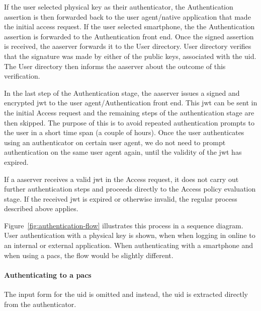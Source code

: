 If the user selected physical key as their authenticator, the Authentication assertion is then forwarded back to the user agent/native application that made the initial access request. If the user selected smartphone, the the Authentication assertion is forwarded to the Authentication front end. Once the signed assertion is received, the \acrshort{aaserver} forwards it to the User directory. User directory verifies that the signature was made by either of the public keys, associated with the \acrshort{uid}. The User directory then informs the \acrshort{aaserver} about the outcome of this verification.

In the last step of the Authentication stage, the \acrshort{aaserver} issues a signed and encrypted \acrshort{jwt} to the user agent/Authentication front end. This \acrshort{jwt} can be sent in the initial Access request and the remaining steps of the authentication stage are then skipped. The purpose of this is to avoid repeated authentication prompts to the user in a short time span (a couple of hours). Once the user authenticates using an authenticator on certain user agent, we do not need to prompt authentication on the same user agent again, until the validity of the \acrshort{jwt} has expired.

If a \acrshort{aaserver} receives a valid \acrshort{jwt} in the Access request, it does not carry out further authentication steps and proceeds directly to the Access policy evaluation stage. If the received \acrshort{jwt} is expired or otherwise invalid, the regular process described above applies.

Figure~\ref{fig:authentication-flow} illustrates this process in a sequence diagram. User authentication with a physical key is shown, when when logging in online to an internal or external application.
When authenticating with a smartphone and when using a \acrshort{pacs}, the flow would be slightly different.

\paragraph{Authenticating to a \acrshort{pacs}} 
The input form for the \acrshort{uid} is omitted and instead, the \acrshort{uid} is extracted directly from the authenticator.


